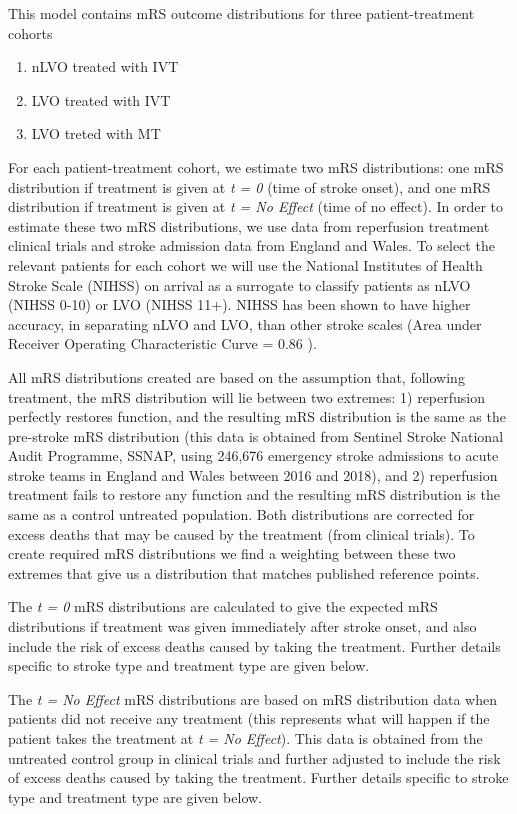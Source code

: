 This model contains mRS outcome distributions for three patient-treatment cohorts

\begin{enumerate}
    \item nLVO treated with IVT
    \item LVO treated with IVT
    \item LVO treted with MT
\end{enumerate}

For each patient-treatment cohort, we estimate two mRS distributions: one mRS distribution if treatment is given at \emph{t = 0} (time of stroke onset), and one mRS distribution if treatment is given at \emph{t = No Effect} (time of no effect). In order to estimate these two mRS distributions, we use data from reperfusion treatment clinical trials and stroke admission data from England and Wales. To select the relevant patients for each cohort we will use the National Institutes of Health Stroke Scale (NIHSS) on arrival as a surrogate to classify patients as nLVO (NIHSS 0-10) or LVO (NIHSS 11+). NIHSS has been shown to have higher accuracy, in separating nLVO and LVO, than other stroke scales (Area under Receiver Operating Characteristic Curve = 0.86 \cite{duvekot_comparison_2021}).

All mRS distributions created are based on the assumption that, following treatment, the mRS distribution will lie between two extremes: 1) reperfusion perfectly restores function, and the resulting mRS distribution is the same as the pre-stroke mRS distribution (this data is obtained from Sentinel Stroke National Audit Programme, SSNAP, using 246,676 emergency stroke admissions to acute stroke teams in England and Wales between 2016 and 2018), and 2) reperfusion treatment fails to restore any function and the resulting mRS distribution is the same as a control untreated population. Both distributions are corrected for excess deaths that may be caused by the treatment (from clinical trials). To create required mRS distributions we find a weighting between these two extremes that give us a distribution that matches published reference points.

The \emph{t = 0} mRS distributions are calculated to give the expected mRS distributions if treatment was given immediately after stroke onset, and also include the risk of excess deaths caused by taking the treatment. Further details specific to stroke type and treatment type are given below.

The \emph{t = No Effect} mRS distributions are based on mRS distribution data when patients did not receive any treatment (this represents what will happen if the patient takes the treatment at \emph{t = No Effect}). This data is obtained from the untreated control group in clinical trials and further adjusted to include the risk of excess deaths caused by taking the treatment. Further details specific to stroke type and treatment type are given below.

